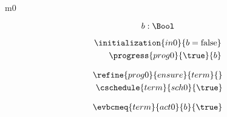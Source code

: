 \documentclass{article}
\begin{document}
	
\begin{machine}{m0}
	
\[
\variable{ b : \Bool }
\]


\begin{align}
\initialization{in0}{b = \false} \\
\progress{prog0}{\true}{b}
\end{align}

\begin{align}
\refine{prog0}{ensure}{term}{} \\
\weakento{term}{default}{sch0} \\
\cschedule{term}{sch0}{\true} 
\end{align}

\begin{align}
\evbcmeq{term}{act0}{b}{\true}
\end{align}


\end{machine}

\newcommand{\Pcs}{\text{P}}
\end{document}
